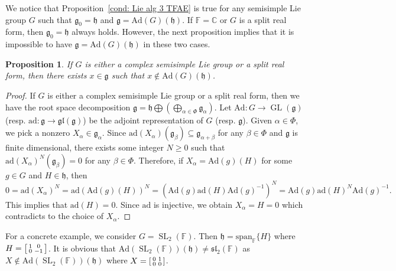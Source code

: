 \documentclass[11pt,reqno]{amsart}
\DeclareMathOperator{\GL}{GL}
\DeclareMathOperator{\SL}{SL}
\newtheorem{proposition}[theorem]{Proposition}
\newcommand{\FF}{\mathbb{F}} %
\newcommand{\spn}{\mathrm{span}}
\newcommand{\Ad}{\mathrm{Ad}}
\newcommand{\ad}{\mathrm{ad}}
\begin{document}
We notice that Proposition~\ref{cond: Lie alg 3 TFAE} is true for any semisimple Lie group $G$ such that $\mathfrak{g}_0 = \mathfrak{h}$ and $\mathfrak{g} = \Ad(G) (\mathfrak{h})$.  If $\mathbb{F} = \mathbb{C}$ or $G$ is a split real form,  then $\mathfrak{g}_0 = \mathfrak{h}$ always holds.  However,  the next proposition implies that it is impossible to have $\mathfrak{g} = \Ad(G) (\mathfrak{h})$ in these two cases.  
\begin{proposition}
If $G$ is either a complex semisimple Lie group or a split real form,  then there exists $x \in \mathfrak{g}$ such that $x \notin \Ad(G)(\mathfrak{h})$.
\end{proposition}
\begin{proof}
If  $G$ is either a complex semisimple Lie group or a split real form,  then we have the root space decomposition $\mathfrak{g} = \mathfrak{h} \bigoplus \left( \bigoplus_{\alpha \in \Phi} \mathfrak{g}_{\alpha} \right)$.  Let $\Ad: G \to \GL(\mathfrak{g})$ (resp.  $\ad: \mathfrak{g} \to \mathfrak{gl}(\mathfrak{g})$) be the adjoint representation of $G$ (resp.  $\mathfrak{g}$).  Given $\alpha \in \Phi$,  we pick a nonzero $X_{\alpha} \in \mathfrak{g}_{\alpha}$.  Since $\ad(X_{\alpha})(\mathfrak{g}_{\beta})  \subseteq \mathfrak{g}_{\alpha + \beta}$ for any $\beta \in \Phi$ and $\mathfrak{g}$ is finite dimensional,  there exists some integer $N \ge 0$ such that $\ad(X_{\alpha})^N (\mathfrak{g}_{\beta}) = 0$ for any $\beta \in \Phi$.  Therefore,  if $X_\alpha = \Ad(g)(H)$ for some $g \in G$ and $H\in \mathfrak{h}$,  then 
\[
0 = \ad(X_{\alpha})^N = \ad \left( \Ad(g)(H) \right)^N = \left( \Ad(g) \ad(H) \Ad(g)^{-1} \right)^N = \Ad(g) \ad(H)^N \Ad(g)^{-1}.
\]
This implies that $\ad(H) = 0$.  Since $\ad$ is injective,  we obtain $X_\alpha = H = 0$ which contradicts to the choice of $X_{\alpha}$. 
\end{proof}
For a concrete example,  we consider $G = \SL_2(\mathbb{F})$.  Then $\mathfrak{h}= \spn_{\FF} \{ H \}$ where $H = \begin{bsmallmatrix} 1 & 0 \\ 0 & -1 \end{bsmallmatrix}$.  It is obvious that $\Ad(\SL_2(\FF)) (\mathfrak{h}) \ne \mathfrak{sl}_2(\FF)$ as $X \not\in \Ad(\SL_2(\FF)) (\mathfrak{h})$ where $X = \begin{bsmallmatrix} 0 & 1 \\ 0 & 0 \end{bsmallmatrix}$.
\end{document}
